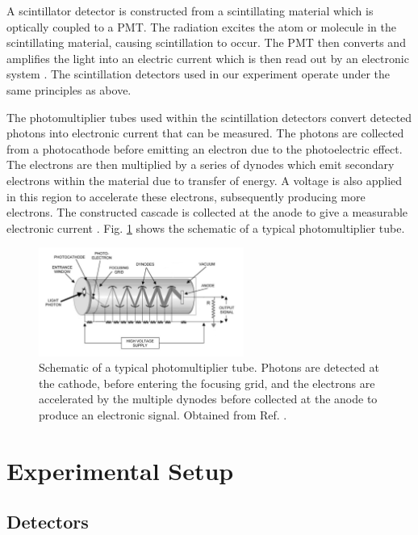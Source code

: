 \documentclass[a4paper]{report}
\numberwithin{equation}{section}
\begin{document}
A scintillator detector is constructed from a scintillating material which is optically coupled to a PMT. The radiation excites the 
atom or molecule in the scintillating material, causing scintillation to occur. The PMT then converts and amplifies the light into 
an electric current which is then read out by an electronic system \cite{Leo1994}. The scintillation detectors used in our experiment 
operate under the same principles as above. \par 


The photomultiplier tubes used within the scintillation detectors convert detected photons into electronic current that can 
be measured. The photons are collected from a photocathode before emitting an electron due to the photoelectric effect. The electrons 
are then multiplied by a series of dynodes which emit secondary electrons within the material due to transfer of energy. A voltage is also applied in this region to accelerate these electrons, subsequently producing more electrons. The constructed cascade is 
collected at the anode to give a measurable electronic current \cite{Leo1994}. Fig. \ref{fig:pmt_schematic} shows the schematic of a typical photomultiplier tube. 


\begin{figure}[htb!]
	\centering
	\includegraphics[width=0.6\textwidth]{pmt_schematic.png}
	\caption{Schematic of a typical photomultiplier tube. Photons are detected at the cathode, before entering the focusing grid,
	 and the electrons are accelerated by the multiple dynodes before collected at the anode to produce an electronic signal.
	 Obtained from Ref. \cite{Danisch2014}.}
	\label{fig:pmt_schematic}	
\end{figure}


\chapter{Experimental Setup} \label{chap:exp_setup}

\section{Detectors}
\end{document}
